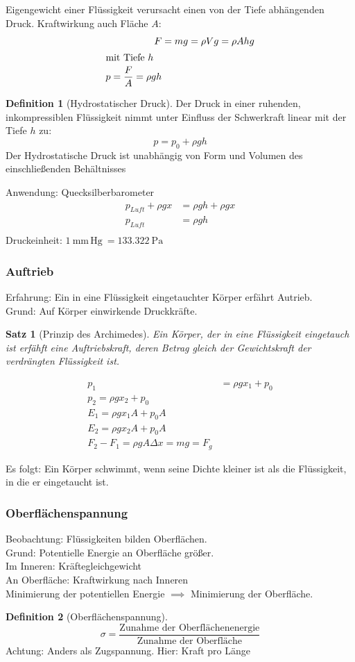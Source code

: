 \documentclass[a4paper]{scrartcl}
\theoremstyle{definition}
\newtheorem{defn}{Definition}
\theoremstyle{plain}
\newtheorem{thm}{Satz}
\theoremstyle{plain}
\theoremstyle{remark}
\theoremstyle{remark}
\theoremstyle{remark}
\begin{document}
Eigengewicht einer Flüssigkeit verursacht einen von der Tiefe abhängenden Druck.
Kraftwirkung auch Fläche $A$:
\begin{align*}
F &= m g = \rho V g = \rho A h g \\
\intertext{mit Tiefe $h$}
p = \frac{F}{A} = \rho g h
\end{align*}
\begin{defn}[Hydrostatischer Druck]
Der Druck in einer ruhenden, inkompressiblen Flüssigkeit nimmt unter Einfluss der
Schwerkraft linear mit der Tiefe $h$ zu:
\[p = p_0 + \rho g h\]
Der Hydrostatische Druck ist unabhängig von Form und Volumen
des einschließenden Behältnisses
\end{defn}
Anwendung: Quecksilberbarometer
\begin{align*}
p_{Luft} + \rho g x &= \rho g h + \rho g x \\
p_{Luft} &= \rho g h \\
\end{align*}
Druckeinheit: $\SI{1}{\milli\meter}\,\text{Hg}~= \SI{133.322}{\pascal}$
\subsubsection{Auftrieb}
\label{sec-9-4-1}
Erfahrung: Ein in eine Flüssigkeit eingetauchter Körper erfährt Autrieb. \\
        Grund: Auf Körper einwirkende Druckkräfte.
\begin{thm}[Prinzip des Archimedes]
Ein Körper, der in eine Flüssigkeit eingetauch ist
erfähft eine Auftriebskraft, deren Betrag gleich der
Gewichtskraft der verdrängten Flüssigkeit ist.
\end{thm}
\begin{align*}
p_1 &= \rho g x_1 + p_0 \\
p_2 = \rho g x_2 + p_0 \\
E_1 = \rho g x_1 A + p_0 A \\
E_2 = \rho g x_2 A + p_0 A \\
F_2 - F_1 = \rho g A \Delta x = m g = F_g
\end{align*}

Es folgt: Ein Körper schwimmt, wenn seine Dichte kleiner ist als
die Flüssigkeit, in die er eingetaucht ist.
\subsubsection{Oberflächenspannung}
\label{sec-9-4-2}
Beobachtung: Flüssigkeiten bilden Oberflächen. \\
        Grund: Potentielle Energie an Oberfläche größer. \\
        Im Inneren: Kräftegleichgewicht \\
        An Oberfläche: Kraftwirkung nach Inneren \\
        Minimierung der potentiellen Energie $\implies$ Minimierung der Oberfläche.
\begin{defn}[Oberflächenspannung]
\[\sigma = \frac{\text{Zunahme der Oberflächenenergie}}{\text{Zunahme der Oberfläche}}\]
Achtung: Anders als Zugspannung. Hier: Kraft pro Länge
\end{defn}
\end{document}
